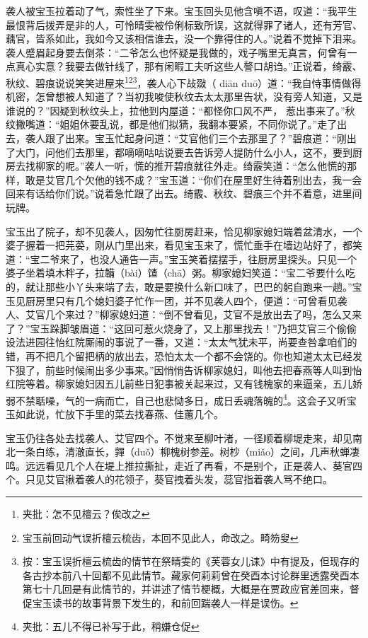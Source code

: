 \documentclass[12pt,oneside]{book}
\begin{document}
袭人被宝玉拉着动了气，索性坐了下来。宝玉回头见他含嗔不语，叹道：“我平生最恨背后拨弄是非的人，可怜晴雯被伶俐标致所误，这就得罪了诸人，还有芳官、藕官，皆系如此，我如今又该相信谁去，没一个靠得住的人。”说着不觉掉下泪来。袭人蹙眉起身要去倒茶：“二爷怎么也怀疑是我做的，戏子嘴里无真言，何曾有一点真心实意？我要去做针线了，那有闲暇工夫听这些人謷口胡诌。”正说着，绮霰、秋纹、碧痕说说笑笑进屋来\footnote{夹批：怎不见檀云？俟改之}\footnote{宝玉前回动气误折檀云梳齿，本回不见此人，命改之。畸笏叟}\footnote{按：宝玉误折檀云梳齿的情节在祭晴雯的《芙蓉女儿诔》中有提及，但现存的各古抄本前八十回都不见此情节。藏家何莉莉曾在癸酉本讨论群里透露癸酉本第七十几回是有此情节的，并讲述了情节梗概，大概是在贾政应官差回来，督促宝玉读书的故事背景下发生的，和前回踹袭人一样是误伤。}，袭人心下敁敠（ diān duō）道：“我自恃事情做得机密，怎曾想被人知道了？当初我唆使秋纹去太太那里告状，没有旁人知道，又是谁说的？”因疑到秋纹头上，拉他到内屋道：“都怪你口风不严， 惹出事来了。”秋纹撇嘴道：“姐姐休要乱说，都是他们拟猜，我翻本要紧，不同你说了。”走了出去，袭人跟了出来。宝玉忙起身问道：“艾官他们三个去那里了？”碧痕道：“刚出了大门，问他们去那里，都嘀嘀咕咕说要去告诉旁人提防什么小人，这不，要到厨房去找柳家的呢。”袭人一听，慌的推开碧痕就往外走。绮霰笑道：“怎么他慌的那样，敢是艾官几个欠他的钱不成？”宝玉道：“你们在屋里好生待着别出去，我一会回来有话给你们说。”说着急忙跟了出去。绮霰、秋纹、碧痕三个并不着意，进里间玩牌。

宝玉出了院子，却不见袭人，因匆忙往厨房赶来，恰见柳家媳妇端着盆清水，一个婆子握着一把芫荽，刚从门里出来，看见宝玉来了，慌忙垂手在墙边站好了，都笑道：“宝二爷来了，也没人通告一声。”宝玉笑着摆摆手，往厨房里探头。只见一个婆子坐着填木柈子，拉韛（bài）馇（chā）粥。柳家媳妇笑道：“宝二爷要什么吃的，就让那些小丫头来端了去，敢是要换什么新口味了，巴巴的躬自跑来一趟。”宝玉见厨房里只有几个媳妇婆子忙作一团，并不见袭人四个，便道：“可曾看见袭人、艾官几个来过？”柳家媳妇道：“倒不曾看见，艾官不是放出去了吗，怎么又来了？”宝玉跺脚皱眉道：“这回可惹火烧身了，又上那里找去！”乃把艾官三个偷偷设法进园往怡红院厮闹的事说了一番，又道：“太太气犹未平，尚要查咎拿咱们的错，再不把几个留把柄的放出去，恐怕太太一个都不会饶的。你也知道太太已经发下狠了，前些时候闹出多少事来。”因悄悄告诉柳家媳妇，叫他去把春燕等人叫到怡红院等着。柳家媳妇因五儿前些日犯事被关起来过，又有钱槐家的来逼亲，五儿娇弱不禁聒噪，气的一病而亡，自己也悲恸多日，成日丢魂落魄的\footnote{夹批：五儿不得已补写于此，稍嫌仓促}。这会子又听宝玉如此说，忙放下手里的菜去找春燕、佳蕙几个。

宝玉仍往各处去找袭人、艾官四个。不觉来至柳叶渚，一径顺着柳堤走来，却见南北一条白练，清澈直长，嚲（duǒ）柳槐树参差。树杪（miǎo）之间，几声秋蝉凄鸣。远远看见几个人在堤上推拉撕扯，走近了再看，不是别个，正是袭人、葵官四个。只见艾官揪着袭人的花领子，葵官拽着头发，蕊官指着袭人骂不绝口。
\end{document}
